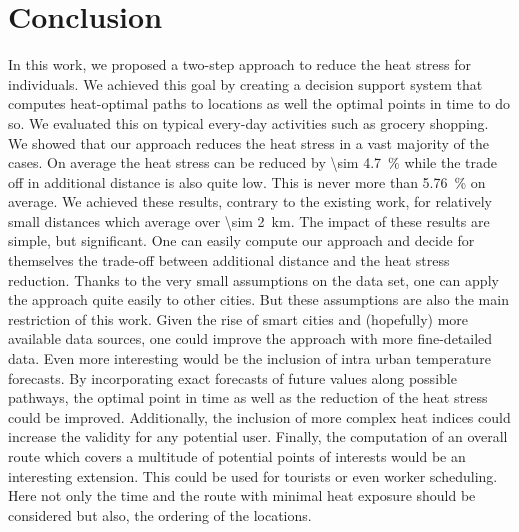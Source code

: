 
\section{Conclusion}

In this work, we proposed a two-step approach to reduce the heat stress for individuals. We achieved this goal by creating a decision support system that computes heat-optimal paths to locations as well the optimal points in time to do so. We evaluated this on typical every-day activities such as grocery shopping. 
We showed that our approach reduces the heat stress in a vast majority of the cases. On average the heat stress can be reduced by \SI{\sim 4.7}{\percent} while the trade off in additional distance is also quite low. This is never more than \SI{5.76}{\percent} on average. We achieved these results, contrary to the existing work, for relatively small distances which average over \SI{\sim  2}{\kilo\meter}.
The impact of these results are simple, but significant. One can easily compute our approach and decide for themselves the trade-off between additional distance and the heat stress reduction.
Thanks to the very small assumptions on the data set, one can apply the approach quite easily to other cities. 
But these assumptions are also the main restriction of this work. Given the rise of smart cities and (hopefully) more available data sources, one could improve the approach with more fine-detailed data. Even more interesting would be the inclusion of intra urban temperature forecasts. By incorporating exact forecasts of future values along possible pathways, the optimal point in time as well as the reduction of the heat stress could be improved. Additionally, the inclusion of more complex heat indices could increase the validity for any potential user. 
Finally, the computation of an overall route which covers a multitude of potential points of interests would be an interesting extension. This could be used for tourists or even worker scheduling. Here not only the time and the route with minimal heat exposure should be considered but also, the ordering of the locations.  